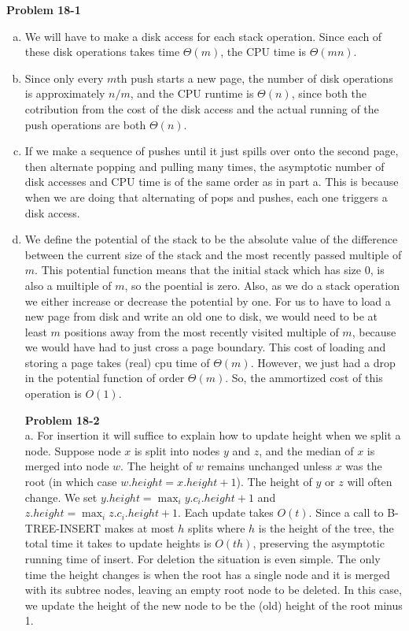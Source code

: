 \documentclass{article}
\begin{document}
\noindent\textbf{Problem 18-1}\\

\begin{enumerate}[a.]
\item
We will have to make a disk access for each stack operation. Since each of these disk operations takes time $\Theta(m)$, the CPU time is $\Theta(mn)$.

\item
Since only every $m$th push starts a new page, the number of disk operations is approximately $n/m$, and the CPU runtime is $\Theta(n)$, since both the cotribution from the cost of the disk access and the actual running of the push operations are both $\Theta(n)$.
\item
If we make a sequence of pushes until it just spills over onto the second page, then alternate popping and pulling many times, the asymptotic number of disk accesses and CPU time is of the same order as in part a. This is because when we are doing that alternating of pops and pushes, each one triggers a disk access.
\item
We define the potential of the stack to be the absolute value of the difference between the current size of the stack and the most recently passed multiple of $m$. This potential function means that the initial stack which has size 0, is also a muiltiple of $m$, so the poential is zero. Also, as we do a stack operation we either increase or decrease the potential by one. For us to have to load a new page from disk and write an old one to disk, we would need to be at least $m$ positions away from the most recently visited multiple of $m$, because we would have had to just cross a page boundary. This cost of loading and storing a page takes (real) cpu time of $\Theta(m)$. However, we just had a drop in the potential function of order $\Theta(m)$. So, the ammortized cost of this operation is $O(1)$.

\noindent\textbf{Problem 18-2}\\

a. For insertion it will suffice to explain how to update height when we split a node.  Suppose node $x$ is split into nodes $y$ and $z$, and the median of $x$ is merged into node $w$.  The height of $w$ remains unchanged unless $x$ was the root (in which case $w.height = x.height + 1$).  The height of $y$ or $z$ will often change.  We set $y.height = \max_{i} y.c_i.height + 1$ and $z.height = \max_i z.c_i.height + 1$.  Each update takes $O(t)$.  Since a call to B-TREE-INSERT makes at most $h$ splits where $h$ is the height of the tree, the total time it takes to update heights is $O(th)$, preserving the asymptotic running time of insert.  For deletion the situation is even simple.  The only time the height changes is when the root has a single node and it is merged with its subtree nodes, leaving an empty root node to be deleted.  In this case, we update the height of the new node to be the (old) height of the root minus 1. \\


\end{enumerate}
\end{document}
